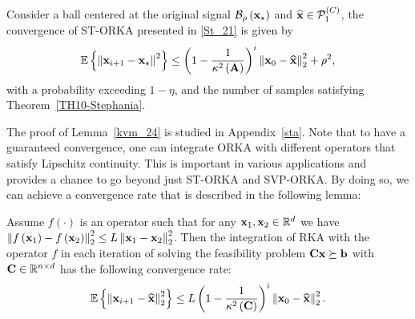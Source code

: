 \documentclass[12pt,draftcls,onecolumn]{IEEEtran}
\begin{document}
\begin{lemma}
\label{kvm_24}
Consider a ball centered at the original signal $\mathcal{B}_{\rho}\left(\mathbf{x}_{\star}\right)$ and $\widehat{\mathbf{x}}\in\mathcal{P}^{(C)}_{1}$, the convergence of ST-ORKA presented in \eqref{St_21} is given by
\begin{equation}
\label{kvm_25}
\begin{aligned}
\mathbb{E}\left\{\left\|\mbx_{i+1}-\mbx_{\star}\right\|^2\right\}\leq\left(1-\frac{1}{\kappa^{2}\left(\mbA\right)}\right)^{i} \left\|\mbx_{0}-\widehat{\mbx}\right\|^2_2+\rho^2,
\end{aligned}
\end{equation}\normalsize
with a probability exceeding
$1-\eta$, and the number of samples satisfying Theorem~\ref{TH10-Stephania}.
\end{lemma}
The proof of Lemma~\ref{kvm_24} is studied in Appendix~\ref{sta}.
Note that to have a guaranteed convergence, one can integrate ORKA with different operators that satisfy Lipschitz continuity. This is important in various applications and provides a chance to go beyond just ST-ORKA and SVP-ORKA.
By doing so, we can achieve a convergence rate that is described in the following lemma: 
\begin{lemma}
\label{Ea1}
Assume $f(\cdot)$ is an operator such that for any $\mathbf{x}_1,\mathbf{x}_2\in\mathbb{R}^{d}$ we have
$\left\|f\left(\mathbf{x}_1\right)-f\left(\mathbf{x}_2\right)\right\|_2^2 \leq L \left\|\mathbf{x}_1-\mathbf{x}_2\right\|_2^2$.
Then the integration of RKA with the operator $f$ in each iteration of solving the feasibility problem $\mathbf{C}\mathbf{x}\succeq\mathbf{b}$ with $\mathbf{C}\in\mathbb{R}^{n\times d}$ has the following convergence rate:
\begin{equation}
\mathbb{E}\left\{\left\|\mathbf{x}_{i+1}-\widehat{\mathbf{x}}\right\|^2_2\right\}\leq L\left(1-\frac{1}{\kappa^{2}\left(\mathbf{C}\right)}\right)^{i} \left\|\mathbf{x}_{0}-\widehat{\mathbf{x}}\right\|^2_2.
\end{equation}\normalsize

\end{lemma}
\end{document}
